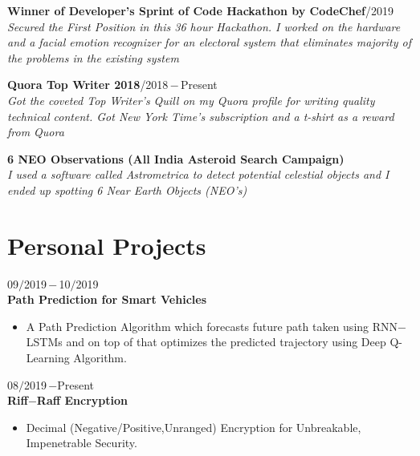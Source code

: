 \documentclass[a4paper, 12pt]{article}
\begin{document}
    \begin{flushleft}
        \textbf{Winner of Developer's Sprint of Code Hackathon by CodeChef}\qquad{}/2019\\\textit{Secured the First Position in this 36 hour Hackathon. I worked on the hardware and a facial emotion recognizer for an electoral system that eliminates majority of the problems in the existing system}
    \end{flushleft}
    
    \begin{flushleft}
        \textbf{Quora Top Writer 2018}\qquad\qquad\qquad\qquad\qquad\qquad\qquad\qquad\qquad\qquad\qquad{}/2018\,$-$\,Present\\\textit{Got the coveted Top Writer's Quill on my Quora profile for writing quality technical content. Got New York Time's subscription and a t-shirt as a reward from Quora}
    \end{flushleft}
    
    \begin{flushleft}
        \textbf{6 NEO Observations (All India Asteroid Search Campaign)}\qquad\qquad{}\\\textit{I used a software called Astrometrica to detect potential celestial objects and I ended up spotting 6 Near Earth Objects (NEO's)}
    \end{flushleft}
    
    
    \section*{Personal Projects}
    \begin{flushleft}
    	09$/$2019\,$-$\,10$/$2019\\
    	\textbf{Path Prediction for Smart Vehicles}
    	\begin{itemize}
    		\item A Path Prediction Algorithm which forecasts future path taken using RNN$-$LSTMs and on top
of that optimizes the predicted trajectory using Deep Q-Learning Algorithm.
    	\end{itemize}
    \end{flushleft}
    \begin{flushleft}
    	08$/$2019\,$-$Present\\
    	\textbf{Riff$-$Raff Encryption}
    	\begin{itemize}
    		\item Decimal (Negative/Positive,Unranged) Encryption for Unbreakable, Impenetrable Security.
    	\end{itemize}
    \end{flushleft}
    
\end{document}
